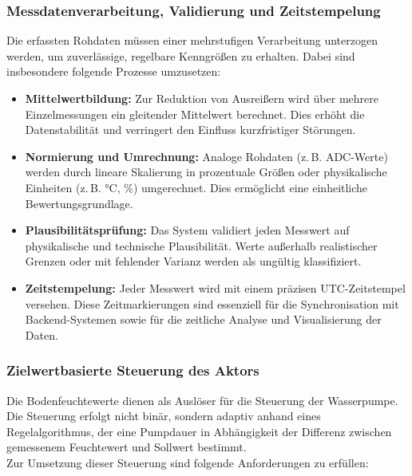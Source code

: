 \subsubsection{Messdatenverarbeitung, Validierung und Zeitstempelung}

Die erfassten Rohdaten müssen einer mehrstufigen Verarbeitung unterzogen werden, um zuverlässige, regelbare Kenngrößen zu erhalten. Dabei sind insbesondere folgende Prozesse umzusetzen:

\begin{itemize}
	\item \textbf{Mittelwertbildung:} Zur Reduktion von Ausreißern wird über mehrere Einzelmessungen ein gleitender Mittelwert berechnet. Dies erhöht die Datenstabilität und verringert den Einfluss kurzfristiger Störungen.
	
	\item \textbf{Normierung und Umrechnung:} Analoge Rohdaten (z.\,B. ADC-Werte) werden durch lineare Skalierung in prozentuale Größen oder physikalische Einheiten (z.\,B. °C, \%) umgerechnet. Dies ermöglicht eine einheitliche Bewertungsgrundlage.
	
	\item \textbf{Plausibilitätsprüfung:} Das System validiert jeden Messwert auf physikalische und technische Plausibilität. Werte außerhalb realistischer Grenzen oder mit fehlender Varianz werden als ungültig klassifiziert.
	
	\item \textbf{Zeitstempelung:} Jeder Messwert wird mit einem präzisen UTC-Zeitstempel versehen. Diese Zeitmarkierungen sind essenziell für die Synchronisation mit Backend-Systemen sowie für die zeitliche Analyse und Visualisierung der Daten.
\end{itemize}

\subsubsection{Zielwertbasierte Steuerung des Aktors}

Die Bodenfeuchtewerte dienen als Auslöser für die Steuerung der Wasserpumpe. Die Steuerung erfolgt nicht binär, sondern adaptiv anhand eines Regelalgorithmus, der eine Pumpdauer in Abhängigkeit der Differenz zwischen gemessenem Feuchtewert und Sollwert bestimmt.
\\
Zur Umsetzung dieser Steuerung sind folgende Anforderungen zu erfüllen:

